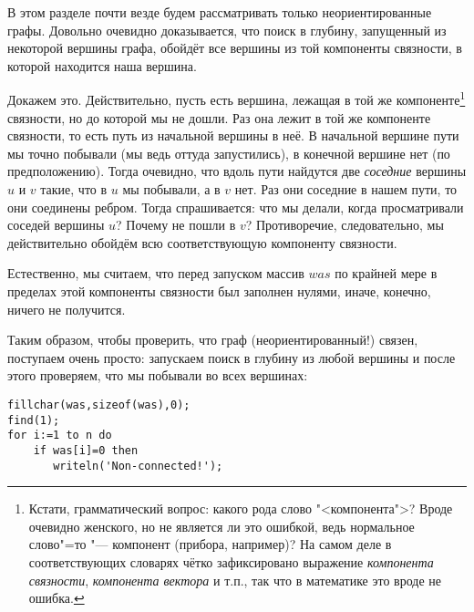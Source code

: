 В этом разделе почти везде будем рассматривать только неориентированные графы.
Довольно очевидно доказывается, что поиск в глубину, запущенный из некоторой вершины графа, обойдёт все вершины
из той компоненты связности, в которой находится наша вершина.

Докажем это. Действительно, пусть есть вершина, лежащая в той же 
компоненте\footnote{Кстати, грамматический вопрос: какого рода слово "<компонента">? Вроде очевидно 
женского, но не является ли это ошибкой, ведь нормальное слово"=то "--- компонент (прибора, например)? На самом деле в 
соответствующих словарях чётко зафиксировано выражение \textit{компонента связности}, 
\textit{компонента вектора} и т.п., так что в математике это вроде не ошибка.}
связности, но до которой мы не дошли.
Раз она лежит в той же компоненте связности, то есть путь из начальной вершины в неё. В начальной вершине пути мы точно побывали (мы ведь оттуда запустились), в конечной вершине нет (по предположению). Тогда очевидно, что вдоль пути найдутся
две \textit{соседние} вершины $u$ и $v$ такие, что в $u$ мы побывали, а в $v$ нет. Раз они соседние в нашем пути, то они
соединены ребром. Тогда спрашивается: что мы делали, когда просматривали соседей вершины $u$? Почему не пошли в $v$? 
Противоречие, следовательно, мы действительно обойдём всю соответствующую компоненту связности.


Естественно, мы считаем, что перед запуском массив $was$ по крайней мере в пределах этой компоненты связности был 
заполнен нулями, иначе, конечно, ничего не получится.


Таким образом, чтобы проверить, что граф (неориентированный!) связен, поступаем очень просто: запускаем поиск в 
глубину из любой вершины и после этого проверяем, что мы побывали во всех вершинах:

\begin{codesampleo}\begin{verbatim}
fillchar(was,sizeof(was),0);
find(1);
for i:=1 to n do
    if was[i]=0 then
       writeln('Non-connected!');
\end{verbatim}\end{codesampleo}

